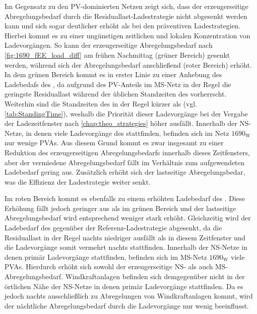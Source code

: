 Im Gegensatz zu den \gls{PV}-dominierten Netzen zeigt sich, dass der erzeugerseitige Abregelungsbedarf durch die Residuallast-Ladestrategie nicht abgesenkt werden kann und sich sogar deutlicher erhöht als bei den präventiven Ladestrategien.
Hierbei kommt es zu einer ungünstigen zeitlichen und lokalen Konzentration von Ladevorgängen.
So kann der erzeugerseitige Abregelungsbedarf nach \autoref{fig:1690_fEE_load_diff} am frühen Nachmittag (grüner Bereich) gesenkt werden, während sich der Abregelungsbedarf anschließend (roter Bereich) erhöht.
In dem grünen Bereich kommt es in erster Linie zu einer Anhebung des Ladebedafs des \UC \Firmeparkplatzdot, da aufgrund des \gls{PV}-Anteils im \gls{MS}-Netz in der Regel die geringste Residuallast während der üblichen Standzeiten des \UC \Firmeparkplatz vorherrscht.
Weiterhin sind die Standzeiten des \UC \Firmeparkplatz in der Regel kürzer als \zH (vgl. \autoref{tab:StandingTime}), weshalb die Priorität dieser Ladevorgänge bei der Vergabe der Ladezeitfenster nach \autoref{chap:theo_strategies} höher ausfällt.
Innerhalb der \gls{NS}-Netze, in denen viele Ladevorgänge des \UC \Firmeparkplatz stattfinden, befinden sich im Netz \(1690_{\text{W}}\) nur wenige \glspl{PVA}.
Aus diesem Grund kommt es zwar insgesamt zu einer Reduktion des erzeugerseitigen Abregelungsbedarfs innerhalb dieses Zeitfensters, aber der vermiedene Abregelungsbedarf fällt im Verhältnis zum aufgewendeten Ladebedarf gering aus.
Zusätzlich erhöht sich der lastseitige Abregelungsbedar, was die Effizienz der Ladestrategie weiter senkt.



Im roten Bereich kommt es ebenfalls zu einem erhöhten Ladebedarf des \UC \Firmeparkplatzdot.
Diese Erhöhung fällt jedoch geringer aus als im grünen Bereich und der lastseitige Abregelungsbedarf wird entsprechend weniger stark erhöht.
Gleichzeitig wird der Ladebedarf des \UCs \zH gegenüber der Referenz-Ladestrategie abgesenkt, da die Residuallast in der Regel nachts niedriger ausfällt als in diesem Zeitfenster und die Ladevorgänge \zH somit vermehrt nachts stattfinden.
Innerhalb der \gls{NS}-Netze in denen primär Ladevorgänge \zH stattfinden, befinden sich im \gls{MS}-Netz \(1690_{\text{W}}\) viele \glspl{PVA}.
Hierdurch erhöht sich sowohl der erzeugerseitige \gls{NS}- als auch \gls{MS}-Abregelungsbedarf.
Windkraftanlagen befinden sich demgegenüber nicht in der örtlichen Nähe der \gls{NS}-Netze in denen primär Ladevorgänge \zH stattfinden.
Da es jedoch nachts ausschließlich zu Abregelungen von Windkraftanlagen kommt, wird der nächtliche Abregelungsbedarf durch die Ladevorgänge nur wenig beeinflusst.


